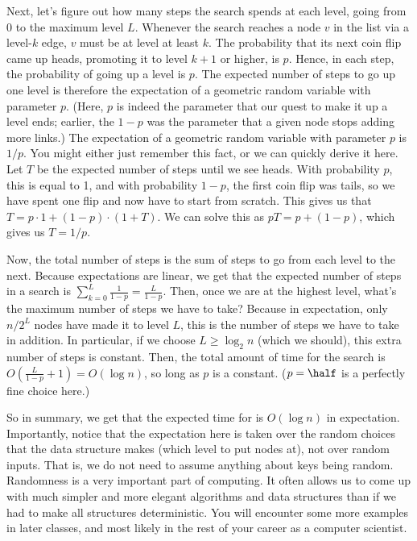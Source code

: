 Next, let's figure out how many steps the search spends at each level,
going from 0 to the maximum level $L$. Whenever the search reaches a node
$v$ in the list via a level-$k$ edge, $v$ must be at level at least
$k$. The probability that its next coin flip came up heads, promoting
it to level $k+1$ or higher, is $p$. Hence, in each step, the
probability of going up a level is $p$.
The expected number of steps to go up one level is therefore
the expectation of a geometric random variable with parameter $p$.
(Here, $p$ is indeed the parameter that our quest to make it up a
level ends; earlier, the $1-p$ was the parameter that a given node
stops adding more links.)
The expectation of a geometric random variable with parameter $p$ is
$1/p$. You might either just remember this fact, or we can quickly
derive it here.
Let $T$ be the expected number of steps until we see heads.
With probability $p$, this is equal to 1, and with probability $1-p$,
the first coin flip was tails, so we have spent one flip and now have
to start from scratch. 
This gives us that $T = p \cdot 1 + (1-p) \cdot (1+T)$. We can solve
this as $pT = p + (1-p)$, which gives us $T = 1/p$.

Now, the total number of steps is the sum of steps to go from each
level to the next. Because expectations are linear, we get that the
expected number of steps in a search is 
$\sum_{k=0}^L \frac{1}{1-p} = \frac{L}{1-p}$. 
Then, once we are at the highest level, what's the maximum number of
steps we have to take? Because in expectation, only $n/2^L$ nodes have
made it to level $L$, this is the number of steps we have to take in
addition. In particular, if we choose $L \geq \log_2 n$ (which we
should), this extra number of steps is constant.
Then, the total amount of time for the search is
$O(\frac{L}{1-p} + 1) = O(\log n)$, so long as $p$ is a constant.
($p=\half$ is a perfectly fine choice here.)

So in summary, we get that the expected time for  is 
$O(\log n)$ in expectation. Importantly, notice that the expectation
here is taken over the random choices that the data structure makes
(which level to put nodes at), not over random inputs. 
That is, we do not need to assume anything about keys being random.
Randomness is a very important part of computing. It often allows us
to come up with much simpler and more elegant algorithms and data
structures than if we had to make all structures deterministic. You
will encounter some more examples in later classes, and most likely in
the rest of your career as a computer scientist.